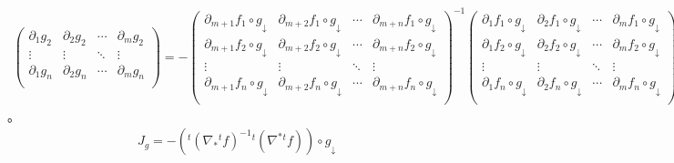 \documentclass[dvipdfmx]{jsarticle}
\begin{document}
\begin{thm}[よりよい陰関数定理]
\begin{itemize}
{\begin{align*}
\begin{pmatrix}
  \partial_{1}g_{2} & \partial_{2}g_{2} & \cdots & \partial_{m}g_{2} \\
  \vdots & \vdots & \ddots & \vdots \\
  \partial_{1}g_{n} & \partial_{2}g_{n} & \cdots & \partial_{m}g_{n} \\
\end{pmatrix} = - \begin{pmatrix}
  \partial_{m + 1}f_{1} \circ g_{\downarrow} & \partial_{m + 2}f_{1} \circ g_{\downarrow} & \cdots & \partial_{m + n}f_{1} \circ g_{\downarrow} \\
  \partial_{m + 1}f_{2} \circ g_{\downarrow} & \partial_{m + 2}f_{2} \circ g_{\downarrow} & \cdots & \partial_{m + n}f_{2} \circ g_{\downarrow} \\
  \vdots & \vdots & \ddots & \vdots \\
  \partial_{m + 1}f_{n} \circ g_{\downarrow} & \partial_{m + 2}f_{n} \circ g_{\downarrow} & \cdots & \partial_{m + n}f_{n} \circ g_{\downarrow} \\
\end{pmatrix}^{- 1} \begin{pmatrix}
  \partial_{1}f_{1} \circ g_{\downarrow} & \partial_{2}f_{1} \circ g_{\downarrow} & \cdots & \partial_{m}f_{1} \circ g_{\downarrow} \\
  \partial_{1}f_{2} \circ g_{\downarrow} & \partial_{2}f_{2} \circ g_{\downarrow} & \cdots & \partial_{m}f_{2} \circ g_{\downarrow} \\
  \vdots & \vdots & \ddots & \vdots \\
  \partial_{1}f_{n} \circ g_{\downarrow} & \partial_{2}f_{n} \circ g_{\downarrow} & \cdots & \partial_{m}f_{n} \circ g_{\downarrow} \\
\end{pmatrix}
\end{align*}}。
\begin{align*}
J_{g} = - \left({}^{t}\left( \nabla_{*}{}^{t}f \right)^{- 1}{}^{t}\left( \nabla^{*}{}^{t}f \right) \right) \circ g_{\downarrow}
\end{align*}
\end{itemize}
\end{thm}
\end{document}
